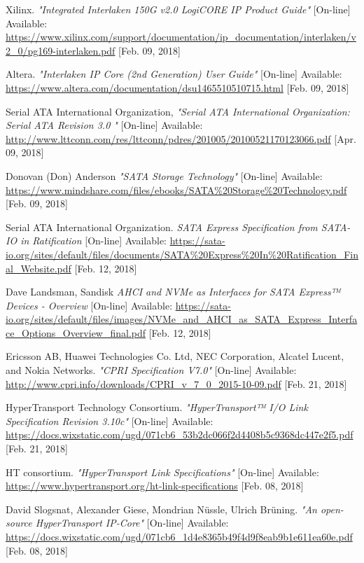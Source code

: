 \begin{thebibliography}{9}
	Xilinx.
	\textit{"Integrated Interlaken 150G v2.0 LogiCORE IP Product Guide"}
	[On-line] Available:
	\url{https://www.xilinx.com/support/documentation/ip_documentation/interlaken/v2_0/pg169-interlaken.pdf} [Feb. 09, 2018]

	Altera.
	\textit{"Interlaken IP Core (2nd Generation) User Guide"}
	[On-line] Available:
	\url{https://www.altera.com/documentation/dsu1465510510715.html} [Feb. 09, 2018]

	Serial ATA International Organization,
	\textit{"Serial ATA International Organization: Serial ATA Revision 3.0 "}
	[On-line] Available:
	\url{http://www.lttconn.com/res/lttconn/pdres/201005/20100521170123066.pdf} [Apr. 09, 2018]

	Donovan (Don) Anderson
	\textit{"SATA Storage Technology"}
	[On-line] Available:
	\url{https://www.mindshare.com/files/ebooks/SATA%20Storage%20Technology.pdf} [Feb. 09, 2018]
	
	Serial ATA International Organization.
	\textit{SATA Express Specification from SATA-IO in Ratification}
	[On-line] Available:
	\url{https://sata-io.org/sites/default/files/documents/SATA%20Express%20In%20Ratification_Final_Website.pdf} [Feb. 12, 2018]

	Dave Landsman, Sandisk
	\textit{AHCI and NVMe as Interfaces for SATA Express™ Devices - Overview}
	[On-line] Available:
	\url{https://sata-io.org/sites/default/files/images/NVMe_and_AHCI_as_SATA_Express_Interface_Options_Overview_final.pdf} [Feb. 12, 2018]
	
	 Ericsson AB, Huawei Technologies Co. Ltd, NEC Corporation, Alcatel Lucent, and Nokia Networks.	 
	\textit{"CPRI Specification V7.0"}
	[On-line] Available:
	\url{http://www.cpri.info/downloads/CPRI_v_7_0_2015-10-09.pdf} [Feb. 21, 2018]	

	 HyperTransport Technology Consortium.	 
	 \textit{"HyperTransport™ I/O Link Specification Revision 3.10c"}
	 [On-line] Available:
	 \url{https://docs.wixstatic.com/ugd/071cb6_53b2dc066f2d4408b5c9368dc447e2f5.pdf} [Feb. 21, 2018]	

	HT consortium.
	\textit{"HyperTransport Link Specifications"}
	[On-line] Available:
	\url{https://www.hypertransport.org/ht-link-specifications} [Feb. 08, 2018]

	David Slogsnat, Alexander Giese, Mondrian Nüssle, Ulrich Brüning.
	\textit{"An open-source HyperTransport IP-Core"}
	[On-line] Available:
	\url{https://docs.wixstatic.com/ugd/071cb6_1d4e8365b49f4d9f8eab9b1e611ea60e.pdf} [Feb. 08, 2018]


\end{thebibliography}
